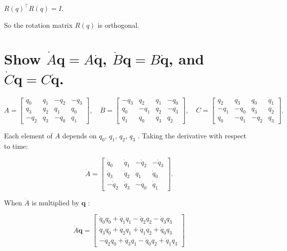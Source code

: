 \documentclass{article}
\begin{document}
$R(q)^\top R(q) = I$.

So the rotation matrix  $R(q)$  is orthogonal.
\section{Show $\dot{A}\boldsymbol{q}=A\dot{\boldsymbol{q}}$, $\dot{B}\boldsymbol{q}=B\dot{\boldsymbol{q}}$, and $\dot{C}\boldsymbol{q}=C\dot{\boldsymbol{q}}$.}

\begin{equation}
A = \left[\begin{array}{cccc}
  q_0 & q_1 & -q_2 & -q_3 \\
  q_3 & q_2 & q_1 & q_0 \\
  -q_2 & q_3 & -q_0 & q_1
  \end{array}\right], \quad
  B = \left[\begin{array}{cccc}
    -q_3 & q_2 & q_1 & -q_0 \\
    q_0 & -q_1 & q_2 & -q_3 \\
    q_1 & q_0 & q_3 & q_2
    \end{array}\right], \quad
  C = \left[\begin{array}{cccc}
    q_2 & q_3 & q_0 & q_1 \\
    -q_1 & -q_0 & q_3 & q_2 \\
    q_0 & -q_1 & -q_2 & q_3
    \end{array}\right].
\end{equation}

Each element of  $A$  depends on  $q_0$, $q_1$, $q_2$, $q_3$ . Taking the derivative with respect to time:

\begin{equation}
  \dot{A} = \begin{bmatrix}
    \dot{q}_0 & \dot{q}_1 & -\dot{q}_2 & -\dot{q}_3 \\
    \dot{q}_3 & \dot{q}_2 & \dot{q}_1 & \dot{q}_0 \\
    -\dot{q}_2 & \dot{q}_3 & -\dot{q}_0 & \dot{q}_1
    \end{bmatrix}.
\end{equation}

When $\dot{A}$  is multiplied by  $\boldsymbol{q}$ :

\begin{equation}
  \dot{A}\boldsymbol{q} = 
    \begin{bmatrix}
    \dot{q}_0q_0 + \dot{q}_1q_1 - \dot{q}_2q_2 - \dot{q}_3q_3 \\
    \dot{q}_3q_0 + \dot{q}_2q_1 + \dot{q}_1q_2 + \dot{q}_0q_3 \\
    -\dot{q}_2q_0 + \dot{q}_3q_1 - \dot{q}_0q_2 + \dot{q}_1q_3
    \end{bmatrix}    
\end{equation}
\end{document}
